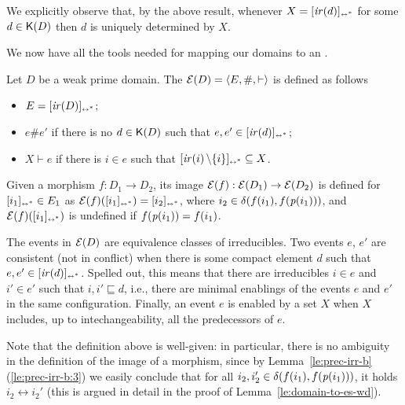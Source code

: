 We explicitly observe that, by the above result, whenever $X = [{\mathop{\mathit{ir}({d})}}]_{\scriptscriptstyle {\leftrightarrow^*}}$ for some $d \in \mathop{\mathsf{K}({D})}$ then $d$ is uniquely determined by $X$.


We now have all the tools needed for mapping our domains to an {\esabbr}.

\begin{definition}
\label{de:esfusdom}
  Let $D$ be a weak prime domain. The {\esabbr}
  $\mathcal{E}({D}) = \langle E, \#, \vdash \rangle$ is defined as
  follows
  \begin{itemize}

  \item $E = [{\mathop{\mathit{ir}({D})}}]_{\scriptscriptstyle {\leftrightarrow^*}}$;

  \item $e \# e'$ if there is no $d \in \mathop{\mathsf{K}({D})}$ such that
    $e, e' \in [{\mathop{\mathit{ir}({d})}}]_{\scriptscriptstyle {\leftrightarrow^*}}$;

  \item $X \vdash e$ if there is $i \in e$ such that
    $[{\mathop{\mathit{ir}({i})} \setminus \{ i \}}]_{\scriptscriptstyle {\leftrightarrow^*}} \subseteq X$.

  \end{itemize}

  Given a morphism $f : D_1 \to D_2$, its image
  $\mathcal{E}({f}) : \mathcal{E}({D_1}) \to \mathcal{E}({D_2})$ is defined  for
  $[{i_1}]_{\scriptscriptstyle {\leftrightarrow^*}} \in {E_1}$ as 
  $\mathcal{E}({f})([{i_1}]_{\scriptscriptstyle {\leftrightarrow^*}})= [{i_2}]_{\scriptscriptstyle {\leftrightarrow^*}}$,
  where $i_2 \in \delta({f(i_1)},{f(\mathit{p}({i_1}))})$, and
  $\mathcal{E}({f})([{i_1}]_{\scriptscriptstyle {\leftrightarrow^*}})$ is undefined if $f(\mathit{p}({i_1})) = f(i_1)$.
\end{definition}

The events in $\mathcal{E}({D})$ are equivalence classes of irreducibles. Two events $e$, $e'$ are consistent (not in conflict) when there is some compact element $d$ such that $e, e' \in [{\mathop{\mathit{ir}({d})}}]_{\scriptscriptstyle {\leftrightarrow^*}}$. Spelled out, this means that there are irreducibles $i \in e$ and $i' \in e'$ such that $i, i' \sqsubseteq d$, i.e., there are minimal enablings of the events $e$ and $e'$ in the same configuration. Finally, an event $e$ is enabled by a set $X$ when $X$ includes, up to intechangeability, all the predecessors of $e$.

Note that the definition above is well-given: in particular, there is no
ambiguity in the definition of the image of a morphism, since by
Lemma~\ref{le:prec-irr-b}(\ref{le:prec-irr-b:3}) we easily conclude
that for all $i_2, i_2' \in \delta({f(i_1)},{f(\mathit{p}({i_1}))})$, it
holds $i_2 \leftrightarrow i_2'$ (this is argued in detail in the proof of Lemma~\ref{le:domain-to-es-wd}).


